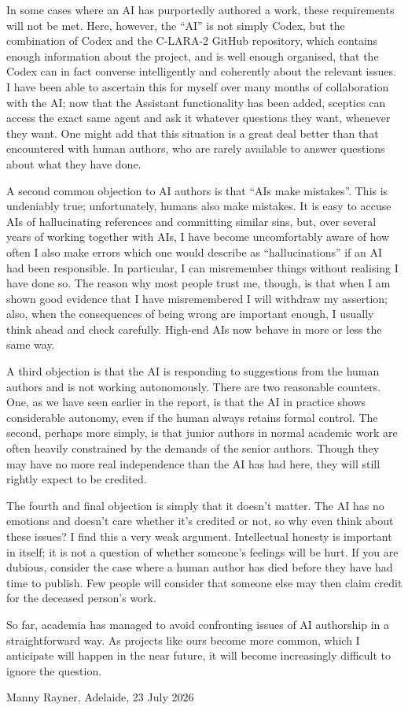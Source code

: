 \documentclass[11pt,a4paper]{article}
\begin{document}
In some cases where an AI has purportedly authored a work, these requirements will not be met. Here, however, the ``AI'' is not simply Codex, but the combination of Codex and the C-LARA-2 GitHub repository, which contains enough information about the project, and is well enough organised, that the Codex can in fact converse intelligently and coherently about the relevant issues. I have been able to ascertain this for myself over many months of collaboration with the AI; now that the Assistant functionality has been added, sceptics can access the exact same agent and ask it whatever questions they want, whenever they want. One might add that this situation is a great deal better than that encountered with human authors, who are rarely available to answer questions about what they have done.

A second common objection to AI authors is that ``AIs make mistakes''. This is undeniably true; unfortunately, humans also make mistakes. It is easy to accuse AIs of hallucinating references and committing similar sins, but, over several years of working together with AIs, I have become uncomfortably aware of how often I also make errors which one would describe as ``hallucinations'' if an AI had been responsible. In particular, I can misremember things without realising I have done so. The reason why most people trust me, though, is that when I am shown good evidence that I have misremembered I will withdraw my assertion; also, when the consequences of being wrong are important enough, I usually think ahead and check carefully. High-end AIs now behave in more or less the same way.

A third objection is that the AI is responding to suggestions from the human authors and is not working autonomously. There are two reasonable counters. One, as we have seen earlier in the report, is that the AI in practice shows considerable autonomy, even if the human always retains formal control. The second, perhaps more simply, is that junior authors in normal academic work are often heavily constrained by the demands of the senior authors. Though they may have no more real independence than the AI has had here, they will still rightly expect to be credited.

The fourth and final objection is simply that it doesn't matter. The AI has no emotions and doesn't care whether it's credited or not, so why even think about these issues? I find this a very weak argument. Intellectual honesty is important in itself; it is not a question of whether someone's feelings will be hurt. If you are dubious, consider the case where a human author has died before they have had time to publish. Few people will consider that someone else may then claim credit for the deceased person's work.

So far, academia has managed to avoid confronting issues of AI authorship in a straightforward way. As projects like ours become more common, which I anticipate will happen in the near future, it will become increasingly difficult to ignore the question.

\vspace{1em}
\noindent Manny Rayner, Adelaide, 23 July 2026

{}


\end{document}

